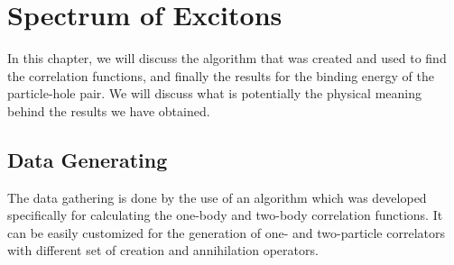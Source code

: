 
\chapter{Spectrum of Excitons}
\label{sec:excitons}
In this chapter, we will discuss the algorithm that was created and used to find the correlation functions, and finally the results for the binding energy of the particle-hole pair. We will discuss what is potentially the physical meaning behind the results we have obtained.

\section{Data Generating}

The data gathering is done by the use of an algorithm which was developed specifically for calculating the one-body and two-body correlation functions. It can be easily customized for the generation of one- and two-particle correlators with different set of creation and annihilation operators.

